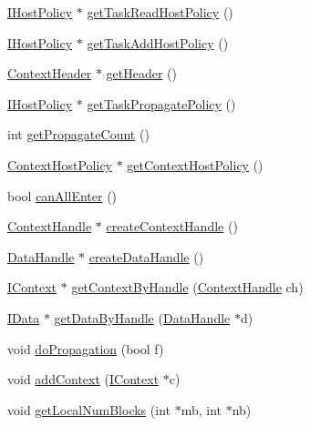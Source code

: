 \begin{DoxyCompactItemize}
\item 
\hyperlink{class_i_host_policy}{IHostPolicy} $\ast$ \hyperlink{class_global_context_ab7afe64dbb26b367d9d49f098de7f158}{getTaskReadHostPolicy} ()
\item 
\hyperlink{class_i_host_policy}{IHostPolicy} $\ast$ \hyperlink{class_global_context_aac8e417def6e6fc45699a87bf412f745}{getTaskAddHostPolicy} ()
\item 
\hyperlink{class_context_header}{ContextHeader} $\ast$ \hyperlink{class_global_context_acede5d21ec0546c5a97ee5752960183a}{getHeader} ()
\item 
\hyperlink{class_i_host_policy}{IHostPolicy} $\ast$ \hyperlink{class_global_context_a70524a314df10d540b267f34d297ec49}{getTaskPropagatePolicy} ()
\item 
int \hyperlink{class_global_context_a62d3dff5570b1e9b14f2b5d7101e9110}{getPropagateCount} ()
\item 
\hyperlink{class_context_host_policy}{ContextHostPolicy} $\ast$ \hyperlink{class_global_context_adee851ed3b5bc641f500fca07ba72498}{getContextHostPolicy} ()
\item 
bool \hyperlink{class_global_context_ac14dc301fa7de1207472da6f515a2f1f}{canAllEnter} ()
\item 
\hyperlink{glb__context_8hpp_a5d74defbecaf11c4dbb0a4ce308e1c34}{ContextHandle} $\ast$ \hyperlink{class_global_context_a933e43be2a62ca16e4ffa34ce5cadb5c}{createContextHandle} ()
\item 
\hyperlink{struct_data_handle}{DataHandle} $\ast$ \hyperlink{class_global_context_aa3979e9a5f856d90384ebafb5ca9bf04}{createDataHandle} ()
\item 
\hyperlink{class_i_context}{IContext} $\ast$ \hyperlink{class_global_context_abed42c65852eb40358a222c34108c65a}{getContextByHandle} (\hyperlink{glb__context_8hpp_a5d74defbecaf11c4dbb0a4ce308e1c34}{ContextHandle} ch)
\item 
\hyperlink{class_i_data}{IData} $\ast$ \hyperlink{class_global_context_a82ec626cc456bb864bf2376e2bda621f}{getDataByHandle} (\hyperlink{struct_data_handle}{DataHandle} $\ast$d)
\item 
void \hyperlink{class_global_context_a8f6d2fae9cd8687798b175ad75ba7974}{doPropagation} (bool f)
\item 
void \hyperlink{class_global_context_ab518683a44cc92eb1c1a38a77f29f82d}{addContext} (\hyperlink{class_i_context}{IContext} $\ast$c)
\item 
void \hyperlink{class_global_context_a84061079f4d2d2fcdaeb3b201dd56cea}{getLocalNumBlocks} (int $\ast$mb, int $\ast$nb)

\end{DoxyCompactItemize}
